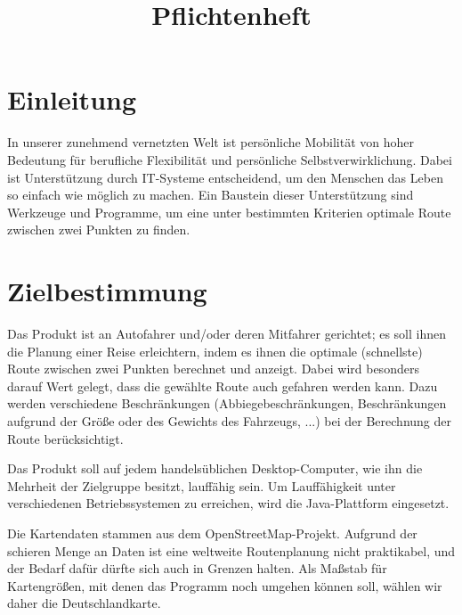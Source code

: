 \documentclass[a4paper, 11pt]{article}
\title{Pflichtenheft}
\begin{document}

\maketitle
\newpage
\tableofcontents
\newpage
\section{Einleitung}
In unserer zunehmend vernetzten Welt ist persönliche Mobilität von hoher Bedeutung für berufliche Flexibilität und persönliche Selbstverwirklichung. Dabei ist Unterstützung durch IT-Systeme entscheidend, um den Menschen das Leben so einfach wie möglich zu machen. Ein Baustein dieser Unterstützung sind Werkzeuge und Programme, um eine unter bestimmten Kriterien optimale Route zwischen zwei Punkten zu finden.

\section{Zielbestimmung}
Das Produkt ist an Autofahrer und/oder deren Mitfahrer gerichtet; es soll ihnen die Planung einer Reise erleichtern, indem es ihnen die optimale (schnellste) Route zwischen zwei Punkten berechnet und anzeigt.
Dabei wird besonders darauf Wert gelegt, dass die gewählte Route auch gefahren werden kann. Dazu werden verschiedene Beschränkungen (Abbiegebeschränkungen, Beschränkungen aufgrund der Größe oder des Gewichts des Fahrzeugs, ...) bei der Berechnung der Route berücksichtigt.

Das Produkt soll auf jedem handelsüblichen Desktop-Computer, wie ihn die Mehrheit der Zielgruppe besitzt, lauffähig sein. Um Lauffähigkeit unter verschiedenen Betriebssystemen zu erreichen, wird die Java-Plattform eingesetzt.

Die Kartendaten stammen aus dem OpenStreetMap-Projekt. Aufgrund der schieren Menge an Daten ist eine weltweite Routenplanung nicht praktikabel, und der Bedarf dafür dürfte sich auch in Grenzen halten. Als Maßstab für Kartengrößen, mit denen das Programm noch umgehen können soll, wählen wir daher die Deutschlandkarte.
\end{document}
